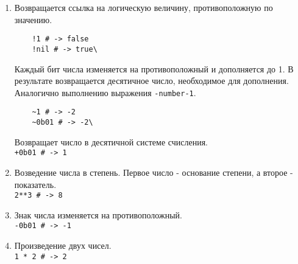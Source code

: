 \begin{enumerate} %

  \item %
  \begin{operator}
    Возвращается ссылка на логическую величину, противоположную по значению.
    \begin{verbatim}
    !1 # -> false
    !nil # -> true\
    \end{verbatim}
  \end{operator}

  \begin{operator}
    Каждый бит числа изменяется на противоположный и дополняется до 1. В результате возвращается десятичное число, необходимое для дополнения. Аналогично выполнению выражения \verb!-number-1!.
    \begin{verbatim}
    ~1 # -> -2
    ~0b01 # -> -2\
    \end{verbatim}
  \end{operator}

  \begin{operator}
    Возвращает число в десятичной системе счисления.
    \\\verb!+0b01 # -> 1!
  \end{operator}

  \item %
  \begin{operator}
    Возведение числа в степень. Первое число - основание степени, а второе - показатель.
    \\\verb!2**3 # -> 8!
  \end{operator}

  \item %
  \begin{operator}
    Знак числа изменяется на противоположный.
    \\\verb!-0b01 # -> -1!
  \end{operator}

  \item %
  \begin{operator}
    Произведение двух чисел.
    \\\verb!1 * 2 # -> 2!
  \end{operator}


\end{enumerate}
